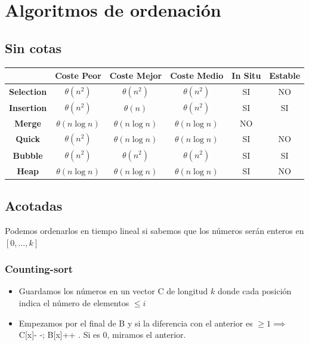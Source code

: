 \documentclass{myclass}
\newcommand{\code}[1]{  #1 }
\begin{document}
\section{Algoritmos de ordenación}

\subsection{Sin cotas}
\begin{center}
\begin{tabular}{|c|c|c|c|c|c|}
\hline
 & \textbf{Coste Peor} & \textbf{Coste Mejor} & \textbf{Coste Medio} & \textbf{In Situ} & \textbf{Estable} \\
 \hline
  \textbf{Selection} & $\theta(n^2)$ & $\theta(n^2)$ & $\theta(n^2)$ & SI & NO \\
 \hline
  \textbf{Insertion} & $\theta(n^2)$ & $\theta(n)$ & $\theta(n^2)$ & SI & SI \\
 \hline
  \textbf{Merge} & $\theta(n\log n)$ & $\theta(n\log n)$ & $\theta(n \log n)$ & NO & \\
 \hline
  \textbf{Quick} & $\theta(n^2)$ & $\theta(n\log n)$ & $\theta(n\log n)$ & SI & NO \\
 \hline
  \textbf{Bubble} & $\theta(n^2)$ & $\theta(n^2)$ & $\theta(n^2)$ & SI & SI \\
 \hline
  \textbf{Heap} & $\theta(n\log n)$ & $\theta(n\log n)$ & $\theta(n\log n)$ & SI & NO \\
 \hline
\end{tabular}
\end{center}

\subsection{Acotadas}
Podemos ordenarlos en tiempo lineal si sabemos que los números serán enteros en $[0,\ldots, k]$
\subsubsection{Counting-sort}
\begin{itemize}
  \item Guardamos los números en un vector \code{C} de longitud $k$ donde cada posición indica el número de elementos $\le i$
  \item Empezamos por el final de \code{B} y si la diferencia con el anterior es $\ge 1 \implies $ \code{C[x]- -; B[x]++}. Si es $0$, miramos el anterior.
\end{itemize}
\end{document}
